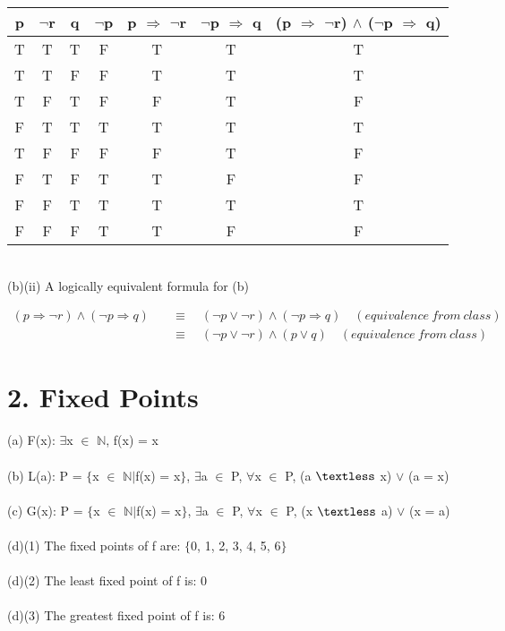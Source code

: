 \documentclass[12pt]{article}
\begin{document}
\begin{tabular}{c c c c c c c}

p & $\neg$r & q & $\neg$p & p $\Rightarrow$ $\neg$r & $\neg$p $\Rightarrow$ q 
&(p $\Rightarrow$ $\neg$r) $\wedge$ ($\neg$p $\Rightarrow$ q) \\

\hline

T & T & T & F & T & T & T \\
T & T & F & F & T & T & T \\
T & F & T & F & F & T & F \\
F & T & T & T & T & T & T \\
T & F & F & F & F & T & F \\
F & T & F & T & T & F & F \\
F & F & T & T & T & T & T \\
F & F & F & T & T & F & F

\end{tabular}
\vspace{20pt}

\newpage

~\\
(b)(ii) A logically equivalent formula for (b)

\vspace{20pt}

\begin{align*}
(p \Rightarrow \neg r) \wedge (\neg p \Rightarrow q) \quad &\equiv \quad
(\neg p \vee \neg r) \wedge (\neg p \Rightarrow q) \quad (equivalence\ from\ class) \\
&\equiv \quad (\neg p \vee \neg r) \wedge (p \vee q) \quad (equivalence\ from\ class)
\end{align*}


\vspace{20pt}

\section*{2. Fixed Points}

\vspace{20pt}


(a) F(x): $\exists$x $\in$ $\mathbb{N}$, f(x) = x \\
~\\
(b) L(a): P = $\{$x $\in$ $\mathbb{N}$$\mid$f(x) = x$\}$, $\exists$a $\in$ P, $\forall$x $\in$ P, 
(a $\textless$ x) $\vee$ (a = x) \\
~\\
(c) G(x): P = $\{$x $\in$ $\mathbb{N}$$\mid$f(x) = x$\}$, $\exists$a $\in$ P, $\forall$x $\in$ P, 
(x $\textless$ a) $\vee$ (x = a) \\
~\\
(d)(1) The fixed points of f are: $\{$0, 1, 2, 3, 4, 5, 6$\}$ \\
~\\
(d)(2) The least fixed point of f is: 0 \\
~\\
(d)(3) The greatest fixed point of f is: 6 
\end{document}
